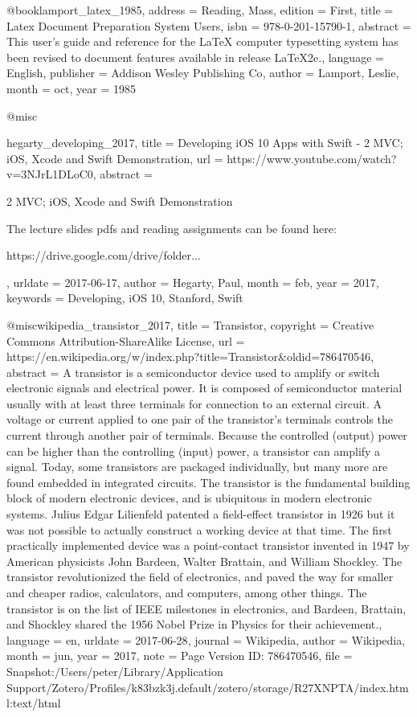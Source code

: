 {{@book{lamport_latex_1985,
	address = {Reading, Mass},
	edition = {First},
	title = {Latex {Document} {Preparation} {System} {Users}},
	isbn = {978-0-201-15790-1},
	abstract = {This user's guide and reference for the LaTeX computer typesetting system has been revised to document features available in release LaTeX2e.},
	language = {English},
	publisher = {Addison Wesley Publishing Co},
	author = {Lamport, Leslie},
	month = oct,
	year = {1985}
}

@misc{hegarty_developing_2017,
	title = {Developing {iOS} 10 {Apps} with {Swift} - 2  {MVC}; {iOS}, {Xcode} and {Swift} {Demonstration}},
	url = {https://www.youtube.com/watch?v=3NJrL1DLoC0},
	abstract = {2  MVC; iOS, Xcode and Swift Demonstration

The lecture slides pdfs and reading assignments can be found here:

https://drive.google.com/drive/folder...},
	urldate = {2017-06-17},
	author = {Hegarty, Paul},
	month = feb,
	year = {2017},
	keywords = {Developing, iOS 10, Stanford, Swift}
}

@misc{wikipedia_transistor_2017,
	title = {Transistor},
	copyright = {Creative Commons Attribution-ShareAlike License},
	url = {https://en.wikipedia.org/w/index.php?title=Transistor&oldid=786470546},
	abstract = {A transistor is a semiconductor device used to amplify or switch electronic signals and electrical power. It is composed of semiconductor material usually with at least three terminals for connection to an external circuit. A voltage or current applied to one pair of the transistor's terminals controls the current through another pair of terminals. Because the controlled (output) power can be higher than the controlling (input) power, a transistor can amplify a signal. Today, some transistors are packaged individually, but many more are found embedded in integrated circuits.
The transistor is the fundamental building block of modern electronic devices, and is ubiquitous in modern electronic systems. Julius Edgar Lilienfeld patented a field-effect transistor in 1926 but it was not possible to actually construct a working device at that time. The first practically implemented device was a point-contact transistor invented in 1947 by American physicists John Bardeen, Walter Brattain, and William Shockley. The transistor revolutionized the field of electronics, and paved the way for smaller and cheaper radios, calculators, and computers, among other things. The transistor is on the list of IEEE milestones in electronics, and Bardeen, Brattain, and Shockley shared the 1956 Nobel Prize in Physics for their achievement.},
	language = {en},
	urldate = {2017-06-28},
	journal = {Wikipedia},
	author = {{Wikipedia}},
	month = jun,
	year = {2017},
	note = {Page Version ID: 786470546},
	file = {Snapshot:/Users/peter/Library/Application Support/Zotero/Profiles/k83bzk3j.default/zotero/storage/R27XNPTA/index.html:text/html}
}

}}
